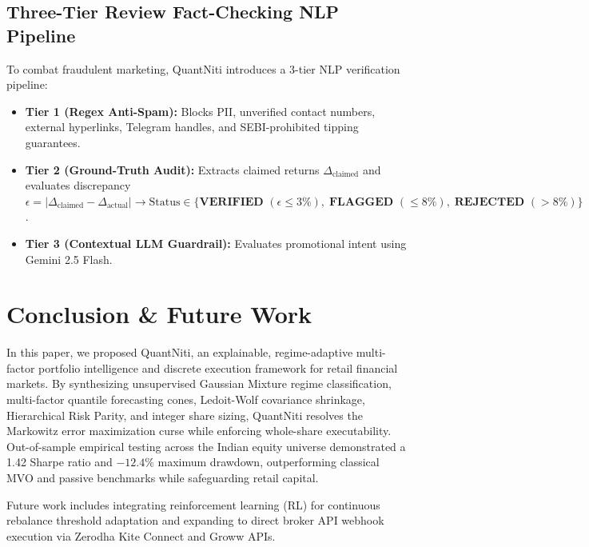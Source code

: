 \documentclass[conference]{IEEEtran}
\begin{document}
\subsection{Three-Tier Review Fact-Checking NLP Pipeline}
To combat fraudulent marketing, QuantNiti introduces a 3-tier NLP verification pipeline:
\begin{itemize}
    \setlength{\itemsep}{0pt}\setlength{\parskip}{0pt}\setlength{\topsep}{0pt}
    \item \textbf{Tier 1 (Regex Anti-Spam):} Blocks PII, unverified contact numbers, external hyperlinks, Telegram handles, and SEBI-prohibited tipping guarantees.
    \item \textbf{Tier 2 (Ground-Truth Audit):} Extracts claimed returns $\Delta_{\text{claimed}}$ and evaluates discrepancy $\epsilon = |\Delta_{\text{claimed}} - \Delta_{\text{actual}}| \to \text{Status} \in \{\textbf{VERIFIED } (\epsilon \le 3\%), \; \textbf{FLAGGED } (\le 8\%), \; \textbf{REJECTED } (> 8\%)\}$.
    \item \textbf{Tier 3 (Contextual LLM Guardrail):} Evaluates promotional intent using Gemini 2.5 Flash.
\end{itemize}

\section{Conclusion \& Future Work}
In this paper, we proposed QuantNiti, an explainable, regime-adaptive multi-factor portfolio intelligence and discrete execution framework for retail financial markets. By synthesizing unsupervised Gaussian Mixture regime classification, multi-factor quantile forecasting cones, Ledoit-Wolf covariance shrinkage, Hierarchical Risk Parity, and integer share sizing, QuantNiti resolves the Markowitz error maximization curse while enforcing whole-share executability. Out-of-sample empirical testing across the Indian equity universe demonstrated a 1.42 Sharpe ratio and $-12.4\%$ maximum drawdown, outperforming classical MVO and passive benchmarks while safeguarding retail capital.

Future work includes integrating reinforcement learning (RL) for continuous rebalance threshold adaptation and expanding to direct broker API webhook execution via Zerodha Kite Connect and Groww APIs.
\end{document}
